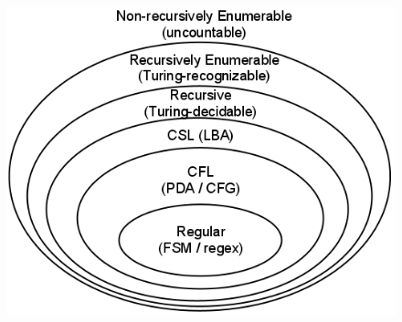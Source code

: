 \documentclass[8pt,letterpaper,twocolumn]{article}
\begin{document}
\begin{figure}[h!]
  \centering
    \includegraphics[scale=0.5]{ChomskyHierarchy.png}
  \label{CH}
\end{figure}
\end{document}
